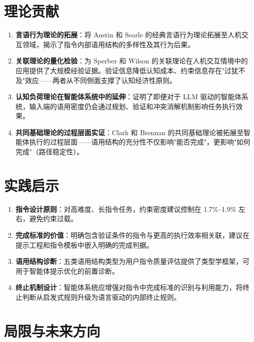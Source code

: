 \documentclass[12pt,a4paper,openany,oneside]{ctexrep}
\begin{document}
\section{理论贡献}


\begin{enumerate}
\item[1.] \textbf{言语行为理论的拓展}：将 Austin 和 Searle 的经典言语行为理论拓展至人机交互领域，揭示了指令内部语用结构的多样性及其行为后果。
\item[2.] \textbf{关联理论的量化检验}：为 Sperber 和 Wilson 的关联理论在人机交互情境中的应用提供了大规模经验证据。验证信息降低认知成本、约束信息存在"过犹不及"效应——两者从不同侧面支撑了认知经济性原则。
\item[3.] \textbf{认知负荷理论在智能体系统中的延伸}：证明了即便对于 LLM 驱动的智能体系统，输入端的语用密度仍会通过规划、验证和冲突消解机制影响任务执行效果。
\item[4.] \textbf{共同基础理论的过程层面实证}：Clark 和 Brennan 的共同基础理论被拓展至智能体执行的过程层面——语用结构的充分性不仅影响"能否完成"，更影响"如何完成"（路径稳定性）。
\end{enumerate}


\section{实践启示}


\begin{enumerate}
\item[1.] \textbf{指令设计原则}：对高难度、长指令任务，约束密度建议控制在 1.7\%–1.9\% 左右，避免约束过载。
\item[2.] \textbf{完成标准的价值}：明确包含验证条件的指令与更高的执行效率相关联，建议在提示工程和指令模板中嵌入明确的完成判据。
\item[3.] \textbf{语用结构诊断}：五类语用结构类型为用户指令质量评估提供了类型学框架，可用于智能体提示优化的前置诊断。
\item[4.] \textbf{终止机制设计}：智能体系统应增强对指令中完成标准的识别与利用能力，将终止判断从启发式规则升级为语言驱动的内部终止规则。
\end{enumerate}


\section{局限与未来方向}
\end{document}
